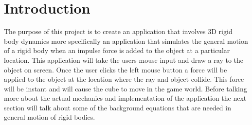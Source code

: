 \section{Introduction}\label{sc:Intro}
The purpose of this project is to create an application that involves 3D rigid body dynamics more specifically an application that simulates the general motion of a rigid body when an impulse force is added to the object at a particular location.
This application will take the users mouse input and draw a ray to the object on screen.
Once the user clicks the left mouse button a force will be applied to the object at the location where the ray and object collide.
This force will be instant and will cause the cube to move in the game world.
Before talking more about the actual mechanics and implementation of the application the next section will talk about some of the background equations that are needed in general motion of rigid bodies.